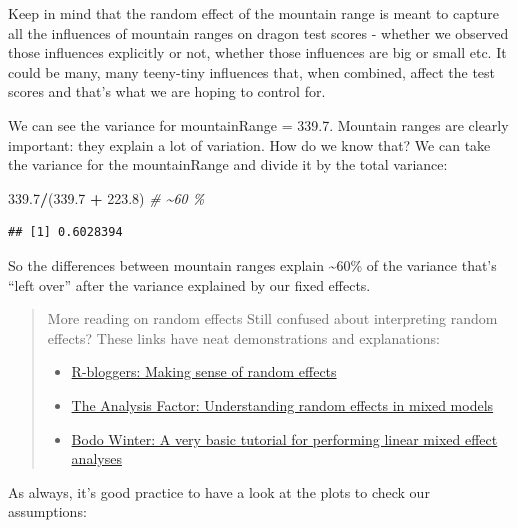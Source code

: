 \documentclass[
]{article}
\newenvironment{Shaded}{\begin{snugshade}}{\end{snugshade}}
\newcommand{\CommentTok}[1]{\textcolor[rgb]{0.56,0.35,0.01}{\textit{#1}}}
\newcommand{\FloatTok}[1]{\textcolor[rgb]{0.00,0.00,0.81}{#1}}
\newcommand{\NormalTok}[1]{#1}
\newcommand{\SpecialCharTok}[1]{\textcolor[rgb]{0.81,0.36,0.00}{\textbf{#1}}}
\providecommand{\tightlist}{%
  \setlength{\itemsep}{0pt}\setlength{\parskip}{0pt}}
\begin{document}
Keep in mind that the random effect of the mountain range is meant to
capture all the influences of mountain ranges on dragon test scores -
whether we observed those influences explicitly or not, whether those
influences are big or small etc. It could be many, many teeny-tiny
influences that, when combined, affect the test scores and that's what
we are hoping to control for.

We can see the variance for mountainRange = 339.7. Mountain ranges are
clearly important: they explain a lot of variation. How do we know that?
We can take the variance for the mountainRange and divide it by the
total variance:

\begin{Shaded}
\begin{Highlighting}[]
\FloatTok{339.7}\SpecialCharTok{/}\NormalTok{(}\FloatTok{339.7} \SpecialCharTok{+} \FloatTok{223.8}\NormalTok{)  }\CommentTok{\# \textasciitilde{}60 \%}
\end{Highlighting}
\end{Shaded}

\begin{verbatim}
## [1] 0.6028394
\end{verbatim}

So the differences between mountain ranges explain \textasciitilde60\%
of the variance that's ``left over'' after the variance explained by our
fixed effects.

\begin{quote}
More reading on random effects Still confused about interpreting random
effects? These links have neat demonstrations and explanations:

\begin{itemize}
\tightlist
\item
  \href{https://www.r-bloggers.com/making-sense-of-random-effects/}{R-bloggers:
  Making sense of random effects}
\item
  \href{https://www.theanalysisfactor.com/understanding-random-effects-in-mixed-models/}{The
  Analysis Factor: Understanding random effects in mixed models}
\item
  \href{http://www.bodowinter.com/tutorial/bw_LME_tutorial.pdf}{Bodo
  Winter: A very basic tutorial for performing linear mixed effect
  analyses}
\end{itemize}
\end{quote}

As always, it's good practice to have a look at the plots to check our
assumptions:
\end{document}
